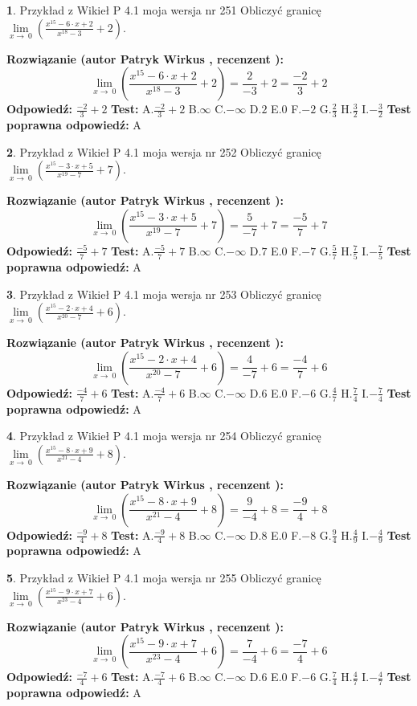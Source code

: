\documentclass[12pt, a4paper]{article}
\theoremstyle{definition} %
\newtheorem{zad}{}
\newcommand{\zadStart}[1]{\begin{zad}#1\newline}
\newcommand{\zadStop}{\end{zad}}
\newcommand{\rozwStart}[2]{\noindent \textbf{Rozwiązanie (autor #1 , recenzent #2): }\newline}
\newcommand{\rozwStop}{\newline}
\newcommand{\odpStart}{\noindent \textbf{Odpowiedź:}\newline}
\newcommand{\odpStop}{\newline}
\newcommand{\testStart}{\noindent \textbf{Test:}\newline}
\newcommand{\testStop}{\newline}
\newcommand{\kluczStart}{\noindent \textbf{Test poprawna odpowiedź:}\newline}
\newcommand{\kluczStop}{\newline}
\begin{document}
\zadStart{Przykład z Wikieł P 4.1 moja wersja nr 251}
Obliczyć granicę $\lim\limits_{x\to\ 0}(\frac{x^{15}-6 \cdot x +2}{x^{18}-3}+2)$.
\zadStop
\rozwStart{Patryk Wirkus}{}
$$\lim\limits_{x\to\ 0}(\frac{x^{15}-6 \cdot x +2}{x^{18}-3}+2)=\frac{2}{-3}+2=\frac{-2}{3}+2$$
\rozwStop
\odpStart
$\frac{-2}{3}+2$
\odpStop
\testStart
A.$\frac{-2}{3}+2$
B.$\infty$
C.$-\infty$
D.$2$
E.$0$
F.$-2$
G.$\frac{2}{3}$
H.$\frac{3}{2}$
I.$-\frac{3}{2}$
\testStop
\kluczStart
A
\kluczStop



\zadStart{Przykład z Wikieł P 4.1 moja wersja nr 252}
Obliczyć granicę $\lim\limits_{x\to\ 0}(\frac{x^{15}-3 \cdot x +5}{x^{19}-7}+7)$.
\zadStop
\rozwStart{Patryk Wirkus}{}
$$\lim\limits_{x\to\ 0}(\frac{x^{15}-3 \cdot x +5}{x^{19}-7}+7)=\frac{5}{-7}+7=\frac{-5}{7}+7$$
\rozwStop
\odpStart
$\frac{-5}{7}+7$
\odpStop
\testStart
A.$\frac{-5}{7}+7$
B.$\infty$
C.$-\infty$
D.$7$
E.$0$
F.$-7$
G.$\frac{5}{7}$
H.$\frac{7}{5}$
I.$-\frac{7}{5}$
\testStop
\kluczStart
A
\kluczStop



\zadStart{Przykład z Wikieł P 4.1 moja wersja nr 253}
Obliczyć granicę $\lim\limits_{x\to\ 0}(\frac{x^{15}-2 \cdot x +4}{x^{20}-7}+6)$.
\zadStop
\rozwStart{Patryk Wirkus}{}
$$\lim\limits_{x\to\ 0}(\frac{x^{15}-2 \cdot x +4}{x^{20}-7}+6)=\frac{4}{-7}+6=\frac{-4}{7}+6$$
\rozwStop
\odpStart
$\frac{-4}{7}+6$
\odpStop
\testStart
A.$\frac{-4}{7}+6$
B.$\infty$
C.$-\infty$
D.$6$
E.$0$
F.$-6$
G.$\frac{4}{7}$
H.$\frac{7}{4}$
I.$-\frac{7}{4}$
\testStop
\kluczStart
A
\kluczStop



\zadStart{Przykład z Wikieł P 4.1 moja wersja nr 254}
Obliczyć granicę $\lim\limits_{x\to\ 0}(\frac{x^{15}-8 \cdot x +9}{x^{21}-4}+8)$.
\zadStop
\rozwStart{Patryk Wirkus}{}
$$\lim\limits_{x\to\ 0}(\frac{x^{15}-8 \cdot x +9}{x^{21}-4}+8)=\frac{9}{-4}+8=\frac{-9}{4}+8$$
\rozwStop
\odpStart
$\frac{-9}{4}+8$
\odpStop
\testStart
A.$\frac{-9}{4}+8$
B.$\infty$
C.$-\infty$
D.$8$
E.$0$
F.$-8$
G.$\frac{9}{4}$
H.$\frac{4}{9}$
I.$-\frac{4}{9}$
\testStop
\kluczStart
A
\kluczStop



\zadStart{Przykład z Wikieł P 4.1 moja wersja nr 255}
Obliczyć granicę $\lim\limits_{x\to\ 0}(\frac{x^{15}-9 \cdot x +7}{x^{23}-4}+6)$.
\zadStop
\rozwStart{Patryk Wirkus}{}
$$\lim\limits_{x\to\ 0}(\frac{x^{15}-9 \cdot x +7}{x^{23}-4}+6)=\frac{7}{-4}+6=\frac{-7}{4}+6$$
\rozwStop
\odpStart
$\frac{-7}{4}+6$
\odpStop
\testStart
A.$\frac{-7}{4}+6$
B.$\infty$
C.$-\infty$
D.$6$
E.$0$
F.$-6$
G.$\frac{7}{4}$
H.$\frac{4}{7}$
I.$-\frac{4}{7}$
\testStop
\kluczStart
A
\kluczStop
\end{document}
